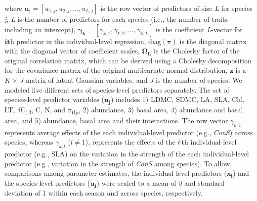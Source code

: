 \documentclass[
  12pt,
  letterpaper,
  DIV=11,
  numbers=noendperiod]{scrartcl}
\begin{document}
where
\(\boldsymbol{u_{j}} = \left[u_{1,j}, u_{2,j}, \ldots, u_{L,j} \right]\)
is the row vector of predictors of size \emph{L} for species \emph{j},
\emph{L} is the number of predictors for each species (i.e., the number
of traits including an intercept),
\(\boldsymbol{\gamma_k} = \left[\gamma_{k,1}, \gamma_{k,2}, \ldots, \gamma_{k,L} \right]\)
is the coefficient \emph{L}-vector for \emph{k}th predictor in the
individual-level regression, \(\mathrm{diag}(\boldsymbol{\tau})\) is the
diagonal matrix with the diagonal vector of coefficient scales,
\(\boldsymbol{\Omega_L}\) is the Cholesky factor of the original
correlation matrix, which can be derived using a Cholesky decomposition
for the covariance matrix of the original multivariate normal
distribution, \(\boldsymbol{z}\) is a \emph{K} \(\times\) \emph{J}
matrix of latent Gaussian variables, and \emph{J} is the number of
species. We modeled five different sets of species-level predictors
separately. The set of species-level predictor variables
(\(\boldsymbol{u_j}\)) includes 1) LDMC, SDMC, LA, SLA, Chl, LT,
\(\delta\)C\textsubscript{13}, C, N, and \(\pi\)\textsubscript{tlp}, 2)
abundance, 3) basal area, 4) abundance and basal area, and 5) abundance,
basal area and their interactions. The row vector \(\gamma_{k,1}\)
represents average effects of the each individual-level predictor (e.g.,
\emph{ConS}) across species, whereas \(\gamma_{k, l}\) (\(l \ne 1\)),
represents the effects of the \emph{l}-th individual-level predictor
(e.g., SLA) on the variation in the strength of the each
individual-level predictor (e.g., variation in the strength of
\emph{ConS} among species). To allow comparisons among parameter
estimates, the individual-level predictors (\(\boldsymbol{x_i}\)) and
the species-level predictors (\(\boldsymbol{u_j}\)) were scaled to a
mean of 0 and standard deviation of 1 within each season and across
species, respectively.
\end{document}
